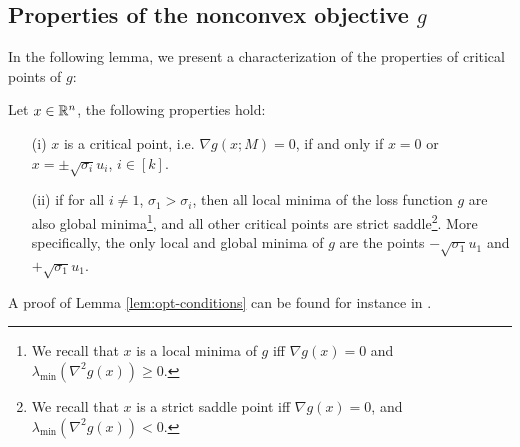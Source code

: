 \subsection{Properties of the nonconvex objective $g$}

In the following lemma, we present a characterization of the properties of critical points of $g$:   

\begin{lemma}\label{lem:opt-conditions}
     Let $x \in \mathbb{R}^{n}$, the following properties hold:
\begin{itemize}
    \item [(i)] $x$ is a critical point, i.e. $\nabla g(x;M) = 0$, if and only if $x = 0$ or $x = \pm \sqrt{\sigma_i} u_i$, $i\in [k]$.
    \item [(ii)] if for all $i \neq 1$, $\sigma_1 > \sigma_i$, then all local minima of the loss function $g$ are also global minima\footnote{We recall that $x$ is a local minima of $g$ iff $\nabla g(x) = 0$ and $\lambda_{\min}(\nabla^2 g(x)) \ge 0$.}, and all other critical points are strict saddle\footnote{We recall that $x$ is a strict saddle point iff $\nabla g(x) = 0$, and  $\lambda_{\min}(\nabla^2 g(x)) < 0$.}. More specifically, the only local and global minima of $g$ are the points $ - \sqrt{\sigma_1} u_1$ and $+\sqrt{\sigma_1} u_1$.
\end{itemize}
\end{lemma}
A proof of Lemma \ref{lem:opt-conditions} can be found for instance in \cite{chi2019nonconvex}. 



